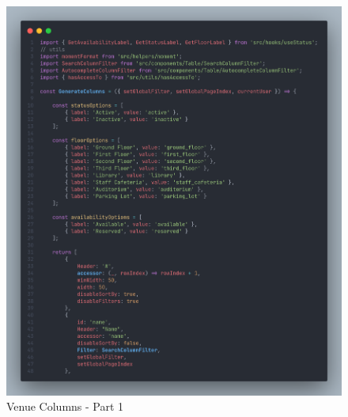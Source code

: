 \begin{justify}
\begin{itemize}
\begin{itemize}
                        \begin{figure}[H]
                            \centerline{\includegraphics[width=150mm,scale=1]{figures/implementation_and_testing/implementation/frontend/columns-1.png}}
                            \caption{Venue Columns - Part 1}
                        \end{figure}


\end{itemize}
\end{itemize}
\end{justify}
